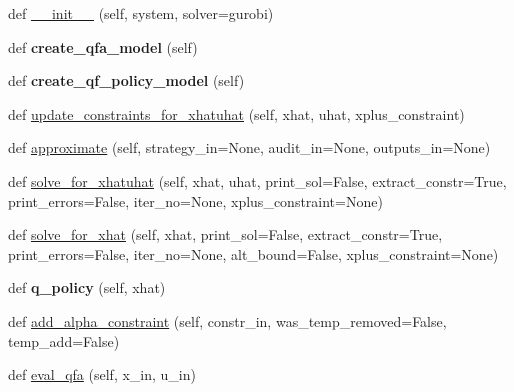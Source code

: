 \begin{DoxyCompactItemize}
\item 
def \mbox{\hyperlink{classgddp_1_1qfa_1_1_q_f_approximator_a93a03d1246461e93c47cb88b8991cae8}{\+\_\+\+\_\+init\+\_\+\+\_\+}} (self, system, solver=\textquotesingle{}gurobi\textquotesingle{})
\item 
\mbox{\label{classgddp_1_1qfa_1_1_q_f_approximator_a0a643f1e288003f351f110f4a6f9057e}} 
def {\bfseries create\+\_\+qfa\+\_\+model} (self)
\item 
\mbox{\label{classgddp_1_1qfa_1_1_q_f_approximator_aed07591908371b31de45560206fc33df}} 
def {\bfseries create\+\_\+qf\+\_\+policy\+\_\+model} (self)
\item 
def \mbox{\hyperlink{classgddp_1_1qfa_1_1_q_f_approximator_a0f3a71348c0348b950b834b8e8f4f4d0}{update\+\_\+constraints\+\_\+for\+\_\+xhatuhat}} (self, xhat, uhat, xplus\+\_\+constraint)
\item 
def \mbox{\hyperlink{classgddp_1_1qfa_1_1_q_f_approximator_aab82083cc8e6b64cc0bedc47532f865f}{approximate}} (self, strategy\+\_\+in=None, audit\+\_\+in=None, outputs\+\_\+in=None)
\item 
def \mbox{\hyperlink{classgddp_1_1qfa_1_1_q_f_approximator_aca8822d616ab1114cbf8175a3f764130}{solve\+\_\+for\+\_\+xhatuhat}} (self, xhat, uhat, print\+\_\+sol=False, extract\+\_\+constr=True, print\+\_\+errors=False, iter\+\_\+no=None, xplus\+\_\+constraint=None)
\item 
def \mbox{\hyperlink{classgddp_1_1qfa_1_1_q_f_approximator_aebd6f739abd857ff3f453f695a0176d3}{solve\+\_\+for\+\_\+xhat}} (self, xhat, print\+\_\+sol=False, extract\+\_\+constr=True, print\+\_\+errors=False, iter\+\_\+no=None, alt\+\_\+bound=False, xplus\+\_\+constraint=None)
\item 
\mbox{\label{classgddp_1_1qfa_1_1_q_f_approximator_a741dfd0b9767bedf3db83f390682f146}} 
def {\bfseries q\+\_\+policy} (self, xhat)
\item 
def \mbox{\hyperlink{classgddp_1_1qfa_1_1_q_f_approximator_a9a577ac6db94ba649cf8e9be227761cc}{add\+\_\+alpha\+\_\+constraint}} (self, constr\+\_\+in, was\+\_\+temp\+\_\+removed=False, temp\+\_\+add=False)
\item 
def \mbox{\hyperlink{classgddp_1_1qfa_1_1_q_f_approximator_a2f3076300b243bc8a38d3fb38c74b8d2}{eval\+\_\+qfa}} (self, x\+\_\+in, u\+\_\+in)

\end{DoxyCompactItemize}
